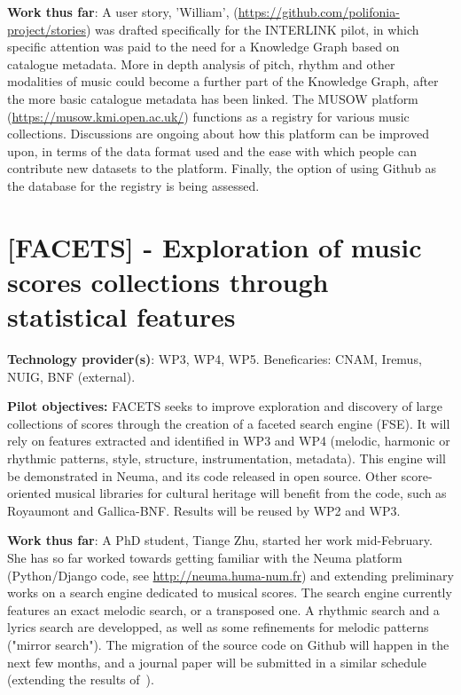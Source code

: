 \textbf{Work thus far}: 
A user story, 'William', (\url {https://github.com/polifonia-project/stories}) was drafted specifically for the INTERLINK pilot, in which specific attention was paid to the need for a Knowledge Graph based on catalogue metadata. More in depth analysis of pitch, rhythm and other modalities of music could become a further part of the Knowledge Graph, after the more basic catalogue metadata has been linked. 
The MUSOW platform (\url {https://musow.kmi.open.ac.uk/}) functions as a registry for various music collections. Discussions are ongoing about how this platform can be improved upon, in terms of the data format used and the ease with which people can contribute new datasets to the platform.
Finally, the option of using Github as the database for the registry is being assessed.

\section{[FACETS] - Exploration of music scores collections through statistical features}\label{sec:pilot:facets}

\textbf{Technology provider(s)}: WP3, WP4, WP5.
Beneficaries: CNAM, Iremus, NUIG, BNF (external).

\textbf{Pilot objectives:} FACETS seeks to improve exploration and discovery of large collections of scores through the creation of a faceted search engine (FSE). It will rely on features extracted and identified in WP3 and WP4 (melodic, harmonic or rhythmic patterns, style, structure, instrumentation, metadata). This engine will be demonstrated in Neuma, and its code released in open source. Other score-oriented musical libraries for cultural heritage will benefit from the code, such as Royaumont and Gallica-BNF. Results will be reused by WP2 and WP3.

\textbf{Work thus far}: A PhD student, Tiange Zhu, started her work mid-February. She has so far worked towards getting familiar with the Neuma platform (Python/Django code, see \url{http://neuma.huma-num.fr}) and extending preliminary works on a search engine dedicated to musical scores. The search engine currently features an exact melodic search, or a transposed one. A rhythmic search and a lyrics search are developped, as well as some refinements for melodic patterns ("mirror search"). The migration of the source code on Github will happen in the next few months, and a journal paper will be submitted in a similar schedule (extending the results of~\cite{rigaux2019scalable}).


